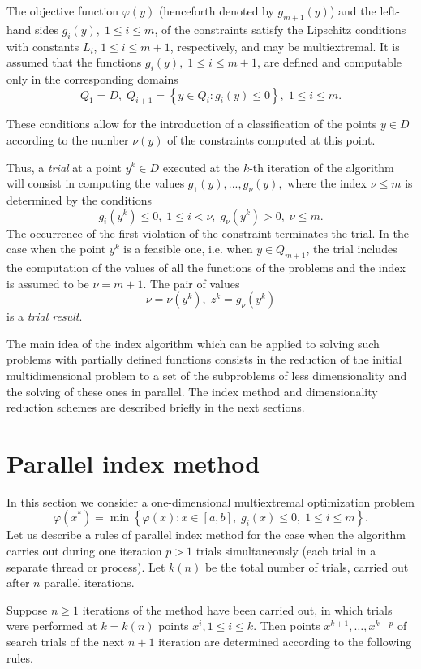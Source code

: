 \documentclass[a4paper]{jpconf}
\begin{document}
The objective function $\varphi(y)$ (henceforth denoted by $g_{m+1}(y)$) and
the left-hand sides $g_i(y), \; 1\leq i \leq m$, of the constraints
satisfy the Lipschitz conditions with constants $L_i$, $1 \leq i \leq
m+1$, respectively, and may be multiextremal. It is assumed that the
functions $g_i(y),\; 1 \leq i \leq m+1$, are defined and computable only in 
the corresponding domains
\[
Q_1=D, \; Q_{i+1}=\left\{y \in Q_i : g_i(y) \leq 0 \right\}, \; 1 \leq i \leq 
m.
\]

These conditions allow for the introduction of a classification of the
points $y \in D$ according to the number $\nu (y)$ of the constraints
computed at this point. 

Thus, a \textit{trial} at a point $y^k \in D$ executed at the $k$-th
iteration of the algorithm will consist in computing the values 
$g_1(y),...,g_\nu(y),$ where the
index $\nu \leq m$ is determined by the conditions
\[
	g_i(y^k )\leq 0, \; 1 \leq i < \nu, \; g_\nu(y^k)>0, \; \nu \leq m.
\]
The occurrence of the first violation of the constraint terminates the
trial. In the case when the point $y^k$ is a feasible one, i.e. when
$y \in Q_{m+1}$, the trial includes the computation of the values of
all the functions of the problems and the index is assumed to be
$\nu=m+1$. The pair of values
\[
\nu=\nu(y^k), \; z^k=g_\nu(y^k)
\]
is a \textit{trial result}.

The main idea of the index algorithm which can be applied to solving such problems 
with partially defined functions consists in the reduction of the initial multidimensional problem to a set of 
the subproblems of less dimensionality and the solving of these ones 
in parallel. The index method and dimensionality reduction schemes are described briefly in the next sections.


\section{Parallel index method}

In this section we consider a one-dimensional multiextremal optimization problem
\[
\varphi(x^\ast)=\min{\left\{\varphi(x): x \in [a,b], \; g_i(x)\leq 0, \; 1 \leq i \leq m\right\}}.
\]
Let us describe a rules of parallel index method for the case when the algorithm carries out during one iteration $p>1$ trials simultaneously (each trial in a separate thread or process). Let $k(n)$ be the total number of trials, carried out after $n$ parallel iterations.

Suppose $n\geq 1$  iterations of the method have been carried out, in which trials were performed at $k=k(n)$ points $x^i,1\leq i \leq k$. Then points $x^{k+1},\dots,x^{k+p}$  of search trials of the next $n+1$ iteration are determined according to the following rules.
\end{document}
